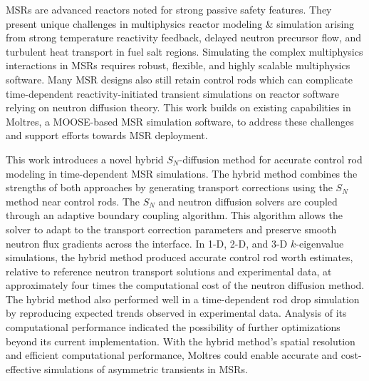\glspl{MSR} are advanced reactors noted for strong passive safety features.
They present unique challenges in multiphysics reactor modeling \& simulation arising from
strong temperature reactivity feedback, delayed neutron precursor flow, and turbulent heat transport
in fuel salt regions. Simulating the complex multiphysics interactions in
\glspl{MSR} requires robust, flexible, and highly scalable multiphysics software. Many \gls{MSR}
designs also still retain control rods which can complicate time-dependent reactivity-initiated
transient simulations on reactor software relying on neutron diffusion theory.
This work builds on existing capabilities in Moltres, a MOOSE-based \gls{MSR} simulation software,
to address these challenges and support efforts towards \gls{MSR} deployment.

This work introduces a novel hybrid
$S_N$-diffusion method for accurate control rod modeling in time-dependent \gls{MSR} simulations.
The hybrid method combines the strengths of both approaches by generating transport corrections
using the $S_N$ method near control rods. The $S_N$ and neutron diffusion solvers are coupled
through an adaptive boundary coupling algorithm. This algorithm allows the solver to adapt to the
transport correction parameters and preserve smooth neutron flux gradients across the interface.
In 1-D, 2-D, and 3-D $k$-eigenvalue simulations, the hybrid method produced accurate control
rod worth estimates, relative to reference neutron transport solutions and experimental data,
at approximately four times the computational cost of the neutron diffusion method.
The hybrid method also performed well in a time-dependent rod drop simulation
by reproducing expected trends observed in experimental data.
Analysis of its computational performance indicated the possibility of further optimizations
beyond its current implementation. With the hybrid method's spatial resolution and
efficient computational performance, Moltres could enable accurate and cost-effective simulations
of asymmetric transients in \glspl{MSR}.

